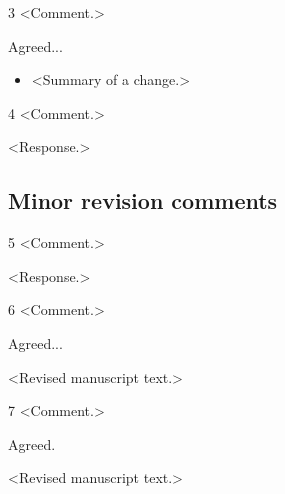\documentclass[11pt]{article}
\begin{document}
\begin{refereecomment}{3}
  <Comment.>
\end{refereecomment}
\begin{authorresponse}
  Agreed...

  \begin{itemize}[leftmargin=*, itemsep=0pt]
    \item <Summary of a change.>
  \end{itemize}
\end{authorresponse}

\begin{refereecomment}{4}
  <Comment.>
\end{refereecomment}
\begin{authorresponse}
  <Response.>
\end{authorresponse}

\subsection*{Minor revision comments}
\begin{refereecomment}{5}
  <Comment.>
\end{refereecomment}
\begin{authorresponse}
  <Response.>
\end{authorresponse}

\begin{refereecomment}{6}
  <Comment.>
\end{refereecomment}
\begin{authorresponse}
  Agreed...
  \begin{manuscriptchange}
    <Revised manuscript text.>
  \end{manuscriptchange}
\end{authorresponse}

\begin{refereecomment}{7}
  <Comment.>
\end{refereecomment}
\begin{authorresponse}
  Agreed.
  \begin{manuscriptchange}
    <Revised manuscript text.>
  \end{manuscriptchange}
\end{authorresponse}
\end{document}
